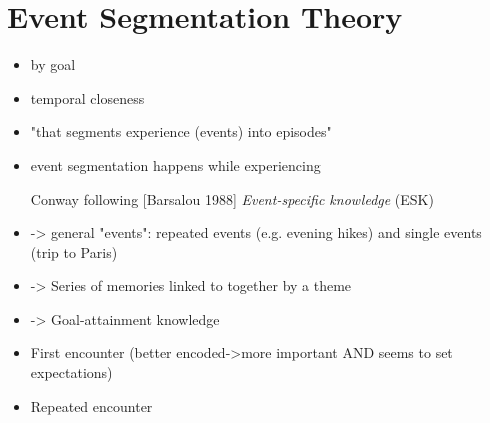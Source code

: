 \section{Event Segmentation Theory}
\cite{black_episodes_1979}\cite{ezzyat_what_2011}\cite{zacks_perceiving_2001}
\begin{itemize}
\item by goal \cite{black_episodes_1979}
\item temporal closeness \cite{black_episodes_1979}\cite{ezzyat_what_2011}
\item "that segments experience (events) into episodes" \cite[p. 248]{ezzyat_what_2011}
\item event segmentation happens while experiencing \cite[p. 248]{ezzyat_what_2011}

\item [Conway] following [Barsalou 1988] \textit{Event-specific knowledge} (ESK)
\item -> general "events": repeated events (e.g. evening hikes) and single events (trip to Paris)
\item -> Series of memories linked to together by a theme
\item -> Goal-attainment knowledge
\item First encounter (better encoded->more important AND seems to set expectations)
\item Repeated encounter
\end{itemize}


